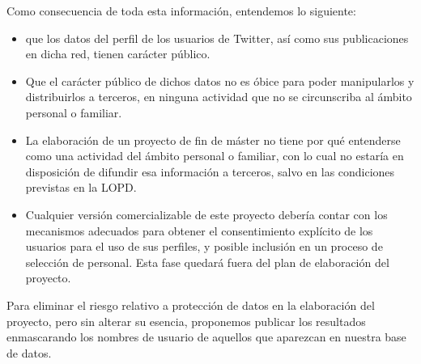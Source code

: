 Como consecuencia de toda esta información, entendemos lo siguiente:
\begin{itemize}
\item que los datos del perfil de los usuarios de Twitter, así como sus publicaciones en dicha red,
tienen carácter público.
\item Que el carácter público de dichos datos no es óbice para poder manipularlos y distribuirlos
a terceros, en ninguna actividad que no se circunscriba al ámbito personal o familiar.
\item La elaboración de un proyecto de fin de máster no tiene por qué entenderse como una 
actividad del ámbito personal o familiar, con lo cual no estaría en disposición de difundir esa información
a terceros, salvo en las condiciones previstas en la LOPD.
\item Cualquier versión comercializable de este proyecto debería contar con los mecanismos
adecuados para obtener el consentimiento explícito de los usuarios para el uso de sus perfiles, 
y posible inclusión en un proceso de selección de personal. Esta fase quedará fuera del plan de elaboración
del proyecto.
\end{itemize}
Para eliminar el riesgo relativo a protección de datos en la elaboración del proyecto, 
pero sin alterar su esencia, proponemos publicar los resultados enmascarando los nombres de usuario 
de aquellos que aparezcan en nuestra base de datos.

